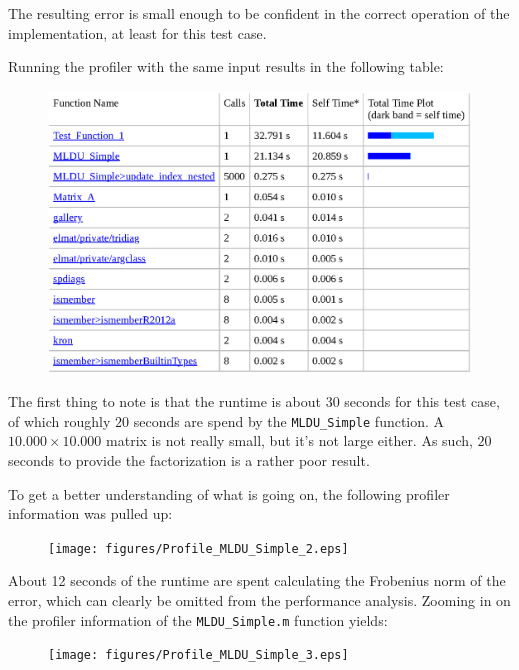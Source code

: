 \noindent The resulting error is small enough to be confident in the correct operation of the implementation, at least for this test case.

\vspace{5mm}

\noindent Running the profiler with the same input results in the following table:

\begin{figure}[h!]
    \includegraphics[width=\linewidth]{figures/Profile_MLDU_Simple_1.eps}
    \centering
\end{figure}

\noindent The first thing to note is that the runtime is about $30$ seconds for this test case, of which roughly $20$ seconds are spend by the \texttt{MLDU\_Simple} function. A $10.000 \times 10.000$ matrix is not really small, but it's not large either. As such, $20$ seconds to provide the factorization is a rather poor result.

\newpage

\noindent To get a better understanding of what is going on, the following profiler information was pulled up:

\begin{figure}[h!]
    \texttt{[image: figures/Profile\_MLDU\_Simple\_2.eps]}
    \centering
\end{figure}

\noindent About 12 seconds of the runtime are spent calculating the Frobenius norm of the error, which can clearly be omitted from the performance analysis. Zooming in on the profiler information of the \texttt{MLDU\_Simple.m} function yields:

\begin{figure}[b!]
    \texttt{[image: figures/Profile\_MLDU\_Simple\_3.eps]}
    \centering
    \label{Piramid}
\end{figure}

